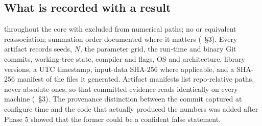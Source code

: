 \documentclass[11pt,a4paper]{article}
\begin{document}
\subsection{What is recorded with a result}
 throughout the core with  excluded from numerical paths; no
 or equivalent reassociation; summation order documented where it matters
(~\S3). Every artifact records seeds, $N$, the parameter
grid, the run-time and binary Git commits, working-tree state, compiler and flags, OS and
architecture, library versions, a UTC timestamp, input-data SHA-256 where applicable, and a
SHA-256 manifest of the files it generated. Artifact manifests list repo-relative paths, never
absolute ones, so that committed evidence reads identically on every machine
(~\S3). The provenance distinction between the commit captured
at configure time and the code that actually produced the numbers was added after Phase 5
showed that the former could be a confident false statement.
\end{document}
